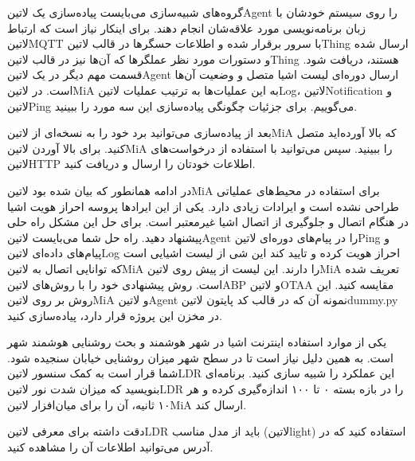 \documentclass[]{assignment}
\begin{document}
گروه‌های شبیه‌سازی می‌بایست پیاده‌سازی یک ‌لاتین{Agent} را روی سیستم خودشان با زبان برنامه‌نویسی مورد علاقه‌شان انجام دهند.
برای اینکار نیاز است که ارتباط ‌لاتین{MQTT}
با سرور برقرار شده و اطلاعات حسگرها در قالب ‌لاتین{Thing} ارسال شده و دستورات مورد نظر عملگرها که آن‌ها نیز در قالب ‌لاتین{Thing} هستند، دریافت شود.
قسمت مهم دیگر در یک ‌لاتین{Agent} ارسال دوره‌ای لیست اشیا متصل و وضعیت آن‌ها است. در ‌لاتین{MiA} به این عملیات‌ها به ترتیب عملیات
‌لاتین{Log}، ‌لاتین{Notification} و ‌لاتین{Ping} می‌گوییم.
برای جزئیات چگونگی پیاده‌سازی این سه مورد  را ببینید.

بعد از پیاده‌سازی می‌توانید برد خود را به نسخه‌ای از ‌لاتین{MiA} که بالا آورده‌اید متصل کنید.
برای بالا آوردن ‌لاتین{MiA}  را ببینید.
سپس می‌توانید با استفاده از درخواست‌های ‌لاتین{HTTP} اطلاعات خودتان را ارسال و دریافت کنید.

در ادامه همانطور که بیان شده بود ‌لاتین{MiA} برای استفاده در محیط‌های عملیاتی طراحی نشده است و ایرادات زیادی دارد. یکی از این ایرادها پروسه احراز هویت اشیا
در هنگام اتصال و جلوگیری از اتصال اشیا غیرمعتبر است. برای حل این مشکل راه حلی پیشنهاد دهید. راه حل شما می‌بایست ‌لاتین{Agent} را در پیام‌های دوره‌ای
‌لاتین{Ping} و پیام‌های داده‌ای ‌لاتین{Log} احراز هویت کرده و تایید کند این شی از لیست اشیایی است که توانایی اتصال به ‌لاتین{MiA}
را دارند. این لیست از پیش روی ‌لاتین{MiA} تعریف شده است. روش پیشنهادی خود را با روش‌های ‌لاتین{ABP} و ‌لاتین{OTAA} مقایسه کنید.
این روش بر روی ‌لاتین{MiA} و ‌لاتین{Agent} نمونه آن که در قالب کد پایتون ‌لاتین{dummy.py} در مخزن این پروژه قرار دارد، پیاده‌سازی کنید.


یکی از موارد استفاده اینترنت اشیا در شهر هوشمند و بحث روشنایی هوشمند شهر است.
به همین دلیل نیاز است تا در سطح شهر میزان روشنایی خیابان سنجیده شود. شما قرار است به کمک سنسور ‌لاتین{LDR} این عملکرد را شبیه سازی کنید.
برنامه‌ای بنویسید که میزان شدت نور ‌لاتین{LDR} را در بازه بسته ۰ تا ۱۰۰ اندازه‌گیری کرده و هر ۱۰ ثانیه، آن را برای میان‌افزار ‌لاتین{MiA} ارسال کند.

دقت داشته برای معرفی ‌لاتین{LDR} باید از مدل مناسب (‌لاتین{light}) استفاده کنید
که در  آدرس می‌توانید اطلاعات آن را مشاهده کنید.
\end{document}
